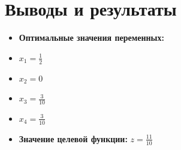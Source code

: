 \section*{Выводы и результаты}
\begin{itemize}
\item \textbf{Оптимальные значения переменных:}
\item $x_1 = \frac{1}{2}$
\item $x_2 = 0$
\item $x_3 = \frac{3}{10}$
\item $x_4 = \frac{3}{10}$
\item \textbf{Значение целевой функции:} $z = \frac{11}{10}$
\end{itemize}
